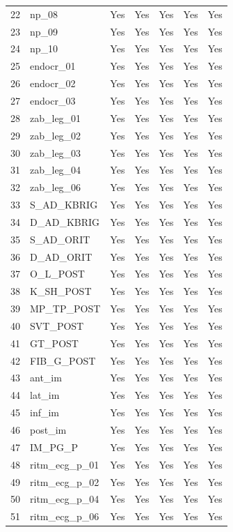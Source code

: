 \begin{longtable}{rlccccc}
22 & np\_08 & Yes & Yes & Yes & Yes & Yes \\
23 & np\_09 & Yes & Yes & Yes & Yes & Yes \\
24 & np\_10 & Yes & Yes & Yes & Yes & Yes \\
25 & endocr\_01 & Yes & Yes & Yes & Yes & Yes \\
26 & endocr\_02 & Yes & Yes & Yes & Yes & Yes \\
27 & endocr\_03 & Yes & Yes & Yes & Yes & Yes \\
28 & zab\_leg\_01 & Yes & Yes & Yes & Yes & Yes \\
29 & zab\_leg\_02 & Yes & Yes & Yes & Yes & Yes \\
30 & zab\_leg\_03 & Yes & Yes & Yes & Yes & Yes \\
31 & zab\_leg\_04 & Yes & Yes & Yes & Yes & Yes \\
32 & zab\_leg\_06 & Yes & Yes & Yes & Yes & Yes \\
33 & S\_AD\_KBRIG & Yes & Yes & Yes & Yes & Yes \\
34 & D\_AD\_KBRIG & Yes & Yes & Yes & Yes & Yes \\
35 & S\_AD\_ORIT & Yes & Yes & Yes & Yes & Yes \\
36 & D\_AD\_ORIT & Yes & Yes & Yes & Yes & Yes \\
37 & O\_L\_POST & Yes & Yes & Yes & Yes & Yes \\
38 & K\_SH\_POST & Yes & Yes & Yes & Yes & Yes \\
39 & MP\_TP\_POST & Yes & Yes & Yes & Yes & Yes \\
40 & SVT\_POST & Yes & Yes & Yes & Yes & Yes \\
41 & GT\_POST & Yes & Yes & Yes & Yes & Yes \\
42 & FIB\_G\_POST & Yes & Yes & Yes & Yes & Yes \\
43 & ant\_im & Yes & Yes & Yes & Yes & Yes \\
44 & lat\_im & Yes & Yes & Yes & Yes & Yes \\
45 & inf\_im & Yes & Yes & Yes & Yes & Yes \\
46 & post\_im & Yes & Yes & Yes & Yes & Yes \\
47 & IM\_PG\_P & Yes & Yes & Yes & Yes & Yes \\
48 & ritm\_ecg\_p\_01 & Yes & Yes & Yes & Yes & Yes \\
49 & ritm\_ecg\_p\_02 & Yes & Yes & Yes & Yes & Yes \\
50 & ritm\_ecg\_p\_04 & Yes & Yes & Yes & Yes & Yes \\
51 & ritm\_ecg\_p\_06 & Yes & Yes & Yes & Yes & Yes \\

\end{longtable}
